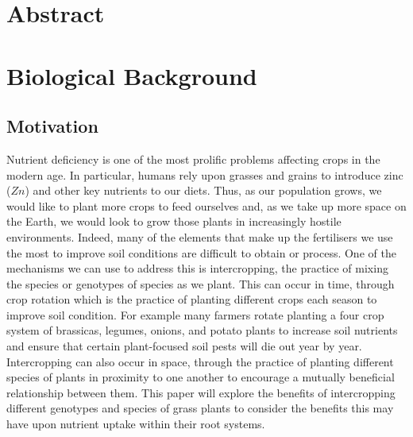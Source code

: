\documentclass[11pt]{article}
\begin{document}
\newpage
\section*{Abstract}
\newpage
\doublespacing
\tableofcontents

\singlespacing
\newpage
{}
\setcounter{page}{1}




\section{Biological Background}

\subsection{Motivation}
Nutrient deficiency is one of the most prolific problems affecting crops in the modern age. In particular, humans rely upon grasses and grains to introduce zinc ($Zn$) and other key nutrients to our diets. Thus, as our population grows, we would like to plant more crops to feed ourselves and, as we take up more space on the Earth, we would look to grow those plants in increasingly hostile environments. Indeed,  many of the elements that make up the fertilisers we use the most to improve soil conditions are difficult to obtain or process. One of the mechanisms we can use to address this is intercropping, the practice of mixing the species or genotypes of species as we plant. This can occur in time, through crop rotation which is the practice of planting different crops each season to improve soil condition. For example many farmers rotate planting a four crop system of brassicas, legumes, onions, and potato plants to increase soil nutrients and ensure that certain plant-focused soil pests will die out year by year. Intercropping can also occur in space, through the practice of planting different species of plants in proximity to one another to encourage a mutually beneficial relationship between them. This paper will explore the benefits of intercropping different genotypes and species of grass plants to consider the benefits this may have upon nutrient uptake within their root systems.
\end{document}
